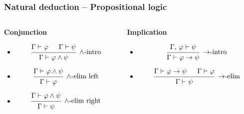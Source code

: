 \documentclass{beamer}
\begin{document}
\begin{frame}
  \frametitle{Natural deduction -- Propositional logic}

  \begin{columns}
    \begin{column}{.3\textwidth}
      \textbf{\quad Conjunction}
      \minipage[c][0.5\textheight][s]{\columnwidth}
      \vspace{0.05\textheight}
      \begin{itemize}
      \item
      \[
        \begin{prooftree}
          \hypo{\Gamma \vdash \varphi}
          \hypo{\Gamma \vdash \psi}
          \infer2[$\scriptsize \wedge$-intro]{\Gamma \vdash \varphi \wedge \psi}
        \end{prooftree}
      \]

      \item
      \[
        \begin{prooftree}
          \hypo{\Gamma \vdash \varphi \wedge \psi}
          \infer1[$\wedge$-elim left]{\Gamma \vdash \varphi}
        \end{prooftree}
      \]

      \item
      \[
        \begin{prooftree}
          \hypo{\Gamma \vdash \varphi \wedge \psi}
          \infer1[$\wedge$-elim right]{\Gamma \vdash \psi}
        \end{prooftree}
      \]
      \end{itemize}
      \endminipage
    \end{column}

      \begin{column}{.45\textwidth}
      \textbf{\qquad Implication}
      \minipage[c][0.5\textheight][s]{\columnwidth}
      \vspace{0.05\textheight}
      \begin{itemize}
      \item
      \[
        \begin{prooftree}
          \hypo{\Gamma, \, \varphi \vdash \psi}
          \infer1[$\rightarrow$-intro]{\Gamma \vdash \varphi \rightarrow \psi}
        \end{prooftree}
      \]

      \item
      \[
        \begin{prooftree}
          \hypo{\Gamma \vdash \varphi \rightarrow \psi}
          \hypo{\Gamma \vdash \varphi}
          \infer2[$\rightarrow$-elim]{\Gamma \vdash \psi}
        \end{prooftree}
      \]
      \end{itemize}
      \endminipage
    \end{column}

  \end{columns}
\end{frame}
\end{document}
